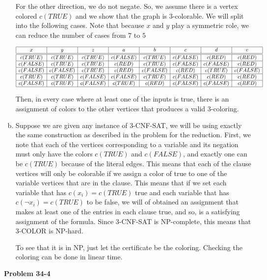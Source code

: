 \documentclass{article}
\begin{document}
\begin{enumerate}[a)]
For the other direction, we do not negate. So, we assume there is a vertex colored $c(TRUE)$ and we show that the graph is 3-colorable. We will split into the following cases. Note that because $x$ and $y$ play a symmetric role, we can reduce the number of cases from $7$ to $5$

\[
\begin{array}{|c|c|c|c|c|c|c|c|}
\hline
x&y&z&a&b&c&d&e\\
\hline
\hline
c(TRUE)&c(TRUE)&c(TRUE)&c(FALSE)&c(TRUE)&c(FALSE)&c(RED)&c(RED)\\
\hline
c(FALSE)&c(TRUE)&c(TRUE)&c(RED)&c(TRUE)&c(FALSE)&c(FALSE)&c(RED)\\
\hline
c(FALSE)&c(FALSE)&c(TRUE)&c(RED)&c(FALSE)&c(RED)&c(TRUE)&c(FALSE)\\
\hline
c(TRUE)&c(TRUE)&c(FALSE)&c(FALSE)&c(TRUE)&c(FALSE)&c(RED)&c(RED)\\
\hline
c(FALSE)&c(TRUE)&c(FALSE)&c(TRUE)&c(RED)&c(FALSE)&c(FALSE)&c(RED)\\
\hline
\end{array}
\]

Then, in every case where at least one of the inputs is true, there is an assignment of colors to the other vertices that produces a valid 3-coloring.
\item
Suppose we are given any instance of 3-CNF-SAT, we will be using exactly the same construction as described in the problem for the reduction. First, we note that each of the vertices corresponding to a variable and its negation must only have the colors $c(TRUE)$ and $c(FALSE)$, and exactly one can be $c(TRUE)$ because of the literal edges. This means that each of the clause vertices will only be colorable if we assign a color of true to one of the variable vertices that are in the clause. This means that if we set each variable that has $c(x_i)=c(TRUE)$ true and each variable that has $c(\neg x_i) = c(TRUE)$ to be false, we will of obtained an assignment that makes at least one of the entries in each clause true, and so, is a satisfying assignment of the formula. Since 3-CNF-SAT is NP-complete, this means that 3-COLOR is NP-hard.

To see that it is in NP, just let the certificate be the coloring. Checking the coloring can be done in linear time.
\end{enumerate}

\noindent\textbf{Problem 34-4}\\
\end{document}
